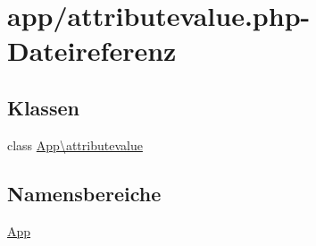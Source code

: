 \hypertarget{attributevalue_8php}{}\section{app/attributevalue.php-\/\+Dateireferenz}
\label{attributevalue_8php}
\subsection*{Klassen}
\begin{DoxyCompactItemize}
\item 
class \hyperlink{classApp_1_1attributevalue}{App\textbackslash{}attributevalue}
\end{DoxyCompactItemize}
\subsection*{Namensbereiche}
\begin{DoxyCompactItemize}
\item 
 \hyperlink{namespaceApp}{App}
\end{DoxyCompactItemize}
